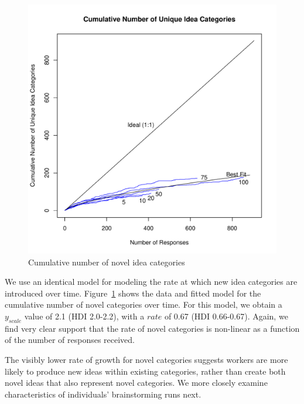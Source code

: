 \begin{figure}[h!]
    \centering
    \includegraphics[width=0.9\columnwidth]{cumulative_categories}
    \caption{Cumulative number of novel idea categories}
    \label{fig:cumulative_categories}
\end{figure}


We use an identical model for modeling the rate at which new idea categories are introduced over time. Figure~\ref{fig:cumulative_categories} shows the data and fitted model for the cumulative number of novel categories over time. For this model, we obtain a $y_{scale}$ value of 2.1 (HDI 2.0-2.2), with a $rate$ of 0.67 (HDI 0.66-0.67). Again, we find very clear support that the rate of novel categories is non-linear as a function of the number of responses received.

The visibly lower rate of growth for novel categories suggests workers are more likely to produce new ideas within existing categories, rather than create both novel ideas that also represent novel categories. We more closely examine characteristics of individuals' brainstorming runs next.

